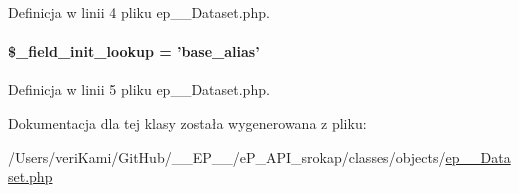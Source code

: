 Definicja w linii 4 pliku ep\-\_\-\-\_\-\-Dataset.\-php.

\hypertarget{classep_____dataset_a4a4d54ae35428077a7c61ec8a5139af3}{
\paragraph[{\$\-\_\-field\-\_\-init\-\_\-lookup}]{\setlength{\rightskip}{0pt plus 5cm}\$\-\_\-field\-\_\-init\-\_\-lookup = 'base\-\_\-alias'}}\label{classep_____dataset_a4a4d54ae35428077a7c61ec8a5139af3}


Definicja w linii 5 pliku ep\-\_\-\-\_\-\-Dataset.\-php.



Dokumentacja dla tej klasy została wygenerowana z pliku\-:\begin{DoxyCompactItemize}
\item 
/\-Users/veri\-Kami/\-Git\-Hub/\-\_\-\-\_\-\-E\-P\-\_\-\-\_\-/e\-P\-\_\-\-A\-P\-I\-\_\-srokap/classes/objects/\hyperlink{ep_____dataset_8php}{ep\-\_\-\-\_\-\-Dataset.\-php}\end{DoxyCompactItemize}
